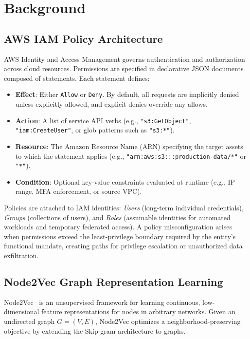 \section{Background}
\label{sec:background}

\subsection{AWS IAM Policy Architecture}
AWS Identity and Access Management governs authentication and authorization across cloud resources. Permissions are specified in declarative JSON documents composed of statements. Each statement defines:
\begin{itemize}
    \item \textbf{Effect}: Either \texttt{Allow} or \texttt{Deny}. By default, all requests are implicitly denied unless explicitly allowed, and explicit denies override any allows.
    \item \textbf{Action}: A list of service API verbs (e.g., \texttt{"s3:GetObject"}, \texttt{"iam:CreateUser"}, or glob patterns such as \texttt{"s3:*"}).
    \item \textbf{Resource}: The Amazon Resource Name (ARN) specifying the target assets to which the statement applies (e.g., \texttt{"arn:aws:s3:::production-data/*"} or \texttt{"*"}).
    \item \textbf{Condition}: Optional key-value constraints evaluated at runtime (e.g., IP range, MFA enforcement, or source VPC).
\end{itemize}

Policies are attached to IAM identities: \emph{Users} (long-term individual credentials), \emph{Groups} (collections of users), and \emph{Roles} (assumable identities for automated workloads and temporary federated access). A policy misconfiguration arises when permissions exceed the least-privilege boundary required by the entity's functional mandate, creating paths for privilege escalation or unauthorized data exfiltration.

\subsection{Node2Vec Graph Representation Learning}
Node2Vec~\cite{grover2016node2vec} is an unsupervised framework for learning continuous, low-dimensional feature representations for nodes in arbitrary networks. Given an undirected graph $G = (V, E)$, Node2Vec optimizes a neighborhood-preserving objective by extending the Skip-gram architecture to graphs. 

